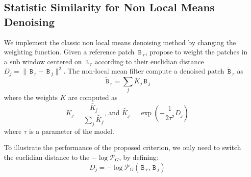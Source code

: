 \documentclass[runningheads]{llncs}
\newcommand{\mat}[1]{\ensuremath{\,\mathtt{#1}\,}}
\begin{document}
\subsection{Statistic Similarity for Non Local Means Denoising}
We implement the classic non local means denoising method \cite{Buades:2005} by changing the weighting function. Given a reference patch $\mat{B}_r$, \cite{Buades:2005} propose to weight the patches in a sub window centered on $\mat{B}_r$ according to their euclidian distance $D_j=\lVert \mat{B}_r- \mat{B}_j \rVert^2$. The non-local mean filter compute a denoised patch $\tilde{\mat{B}}_r$ as
\begin{equation}
 \tilde{\mat{B}}_r=\sum_j K_j \mat{B}_j
\end{equation}
where the weights $K$ are computed as
\[
K_j=\frac{\tilde{K_j}}{\sum_j \tilde{K_j}}\text{, and  } \tilde{K_j}=\exp(-\frac{1}{2\tau^2} D_j)
\]
where $\tau$ is a parameter of the model.

To illustrate the performance of the proposed criterion, we only need to switch the euclidian distance to the $-\log \mathcal{P}_{G}$, by defining:
\[
\tilde{D}_j=-\log \mathcal{P}_{G}(\mat{B}_r,\mat{B}_j)
\]
\end{document}
